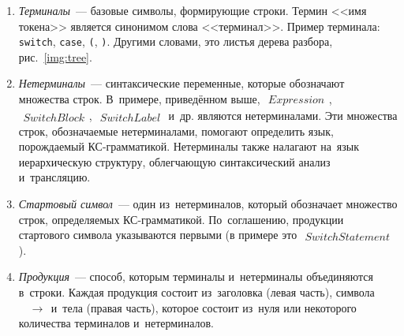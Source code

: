 \begin{enumerate} 
	\item{\textit{Терминалы}~--- базовые символы, формирующие строки. Термин <<имя токена>> является синонимом слова <<терминал>>. Пример терминала: \texttt{switch}, \texttt{case}, \texttt{(}, \texttt{)}}. Другими словами, это листья дерева разбора, рис.~\ref{img:tree}.
	\item{\textit{Нетерминалы}~--- синтаксические переменные, которые обозначают множества строк. В~примере, приведённом выше, $\begin{aligned} Expression \end{aligned}$, $\begin{aligned} SwitchBlock \end{aligned}$, $\begin{aligned} SwitchLabel \end{aligned}$ и~др. являются нетерминалами. Эти множества строк, обозначаемые нетерминалами, помогают определить язык, порождаемый КС-грамматикой. Нетерминалы также налагают на~язык иерархическую структуру, облегчающую синтаксический анализ и~трансляцию.}
	\item{\textit{Стартовый символ}~--- один из~нетерминалов, который обозначает множество строк, определяемых КС-грамматикой. По~соглашению, продукции стартового символа указываются первыми (в примере это $\begin{aligned} SwitchStatement \end{aligned}$).}
	\item{\textit{Продукция}~--- способ, которым терминалы и~нетерминалы объединяются в~строки. Каждая продукция состоит из~заголовка (левая часть), символа $\begin{aligned} &\to \end{aligned}$ и~тела (правая часть), которое состоит из~нуля или некоторого количества терминалов и~нетерминалов.}
\end{enumerate}
